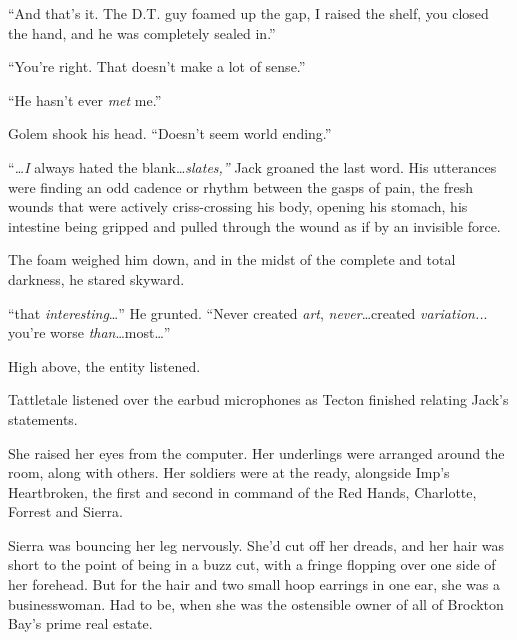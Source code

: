``And that's it.  The D.T. guy foamed up the gap, I raised the shelf, you closed the hand, and he was completely sealed in.''



``You're right.  That doesn't make a lot of sense.''



``He hasn't ever \emph{met} me.''



Golem shook his head.  ``Doesn't seem world ending.''



\blacksquare



``\emph{\ldots}\emph{I }always hated the blank\ldots \emph{slates,'' }Jack groaned the last word.  His utterances were finding an odd cadence or rhythm between the gasps of pain, the fresh wounds that were actively criss-crossing his body, opening his stomach, his intestine being gripped and pulled through the wound as if by an invisible force.



The foam weighed him down, and in the midst of the complete and total darkness, he stared skyward.



``\ldotsNever that \emph{interesting}\ldots''  He grunted.  ``Never created \emph{art}, \emph{never}\ldots created \emph{variation..}.  you're worse \emph{than}\ldots most\ldots''



High above, the entity listened.



\blacksquare



Tattletale listened over the earbud microphones as Tecton finished relating Jack's statements.



She raised her eyes from the computer.  Her underlings were arranged around the room, along with others.  Her soldiers were at the ready, alongside Imp's Heartbroken,  the first and second in command of the Red Hands, Charlotte, Forrest and Sierra.



Sierra was bouncing her leg nervously.  She'd cut off her dreads, and her hair was short to the point of being in a buzz cut, with a fringe flopping over one side of her forehead.  But for the hair and two small hoop earrings in one ear, she was a businesswoman.  Had to be, when she was the ostensible owner of all of Brockton Bay's prime real estate.




